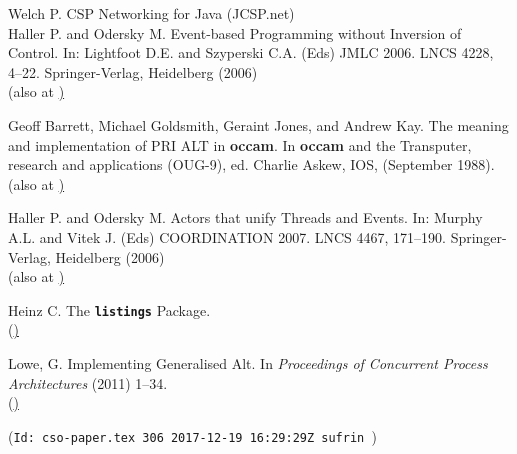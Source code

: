 \documentclass[12pt]{IOS-Book-Article-CPA-2017}
\begin{document}
\begin{thebibliography}{99}
Welch P. CSP Networking for Java (JCSP.net)
\\\href{http://www.cs.kent.ac.uk/projects/ofa/jcsp/jcsp-net-slides-6up.pdf}


Haller P. and Odersky M. Event-based Programming without Inversion of Control.
In: Lightfoot D.E. and Szyperski C.A. (Eds) JMLC 2006. LNCS 4228, 4--22. 
Springer-Verlag, Heidelberg (2006)
\\(also at \href{http://www.scala-lang.org/})

Geoff Barrett, Michael Goldsmith, Geraint Jones, and Andrew Kay.
The meaning and implementation of PRI ALT in
\textbf{\textsf{occam}}.  In \textbf{\textsf{occam}} and the Transputer, 
research and applications (OUG-9), ed. Charlie Askew, IOS, (September 1988).
\\(also at \href{ftp://ftp.comlab.ox.ac.uk/pub/Documents/techpapers/Geraint.Jones/\\OCCAM-1-88.ps.Z})

Haller P. and Odersky M. Actors that unify Threads and Events.
In: Murphy A.L. and Vitek J. (Eds) COORDINATION 2007. LNCS 4467, 171--190.
Springer-Verlag, Heidelberg (2006)
\\(also at \href{http://www.scala-lang.org/})

Heinz C. The \texttt{\textbf{listings}} Package.
\\(\href{http://www.ifi.uio.no/it/latex-links/listings-1.3.pdf})

Lowe, G. Implementing Generalised Alt. 
In \textit{Proceedings of Concurrent Process Architectures} (2011) \mbox{1--34}. 
\\(\href{http://www.cs.ox.ac.uk/gavin.lowe/Papers/alt.pdf})

\end{thebibliography}


\vfill
\vfill
\vfill

{\footnotesize (\verb$Id: cso-paper.tex 306 2017-12-19 16:29:29Z sufrin $)}

\vfill
\end{document}
